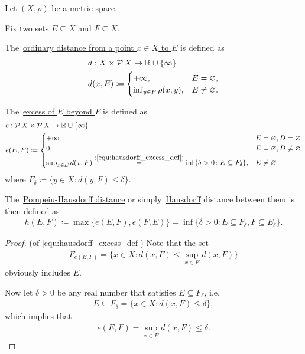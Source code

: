 Let $(X, \rho)$ be a metric space.

\begin{definition}\label{def:hausdorff_distance}\cite[144]{Dontchev2014}
  Fix two sets $E \subseteq X$ and $F \subseteq X$.

  The~\uline{ordinary distance from a point $x \in X$ to $E$} is defined as
  \begin{align*}
    &d: X \times \operatorname{\mathcal P} X \to \mathbb R \cup \{ \infty \}
    \\
    &d(x, E) \coloneqq \begin{cases}
      +\infty, &E = \varnothing, \\
      \inf_{y \in F} \rho(x, y), &E \neq \varnothing.
    \end{cases}
  \end{align*}

  The~\uline{excess of $E$ beyond $F$} is defined as
  \begin{align}\label{equ:hausdorff_excess_def}
    &e: \Power X \times \Power X \to \BB{R} \cup \{ \infty \} \\ \nonumber
    &e(E, F) \coloneqq \begin{cases}
      +\infty, &E = \varnothing, D = \varnothing \\
      0, &E = \varnothing, D \neq \varnothing \\
      \sup_{x \in E} d(x, F) \stackrel{(\ref{equ:hausdorff_excess_def})}{=} \inf \{\delta > 0 \colon E \subseteq F_\delta \}, &E \neq \varnothing \nonumber\refstepcounter{equation}
    \end{cases}
  \end{align}
  where $F_\delta \coloneqq \{ y \in X \colon d(y, F) \leq \delta \}$.

  The~\uline{Pompeiu-Hausdorff distance} or simply~\uline{Hausdorff} distance between them is then defined as
  \begin{align*}
    h(E, F) \coloneqq \max\{ e(E, F), e(F, E) \} = \inf \{\delta > 0 \colon E \subseteq F_\delta, F \subseteq E_\delta \}.
  \end{align*}
\end{definition}
\begin{proof}(of \ref{equ:hausdorff_excess_def})
  Note that the set
  \begin{align*}
    F_{e(E, F)} = \{ x \in X \colon d(x, F) \leq \sup_{x \in E} d(x, F) \}
  \end{align*}
  obviously includes $E$.

  Now let $\delta > 0$ be any real number that satisfies $E \subseteq F_\delta$, i.e.
  \begin{align*}
    E \subseteq F_\delta = \{ x \in X \colon d(x, F) \leq \delta \},
  \end{align*}
  which implies that
  \begin{align*}
    e(E, F) = \sup_{x \in E} d(x, F) \leq \delta.
  \end{align*}
\end{proof}

